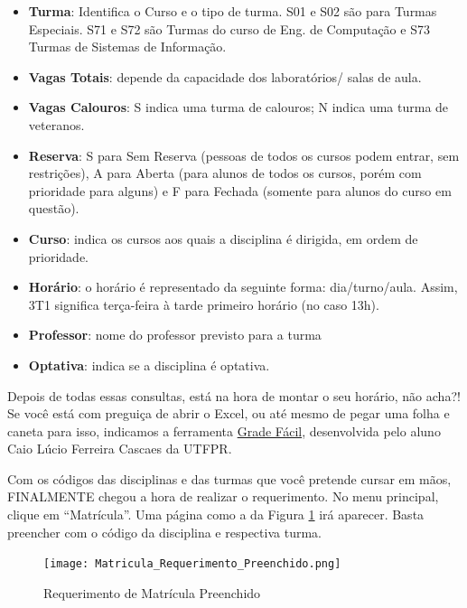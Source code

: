 \documentclass[a4paper,12pt,openany]{article}
\begin{document}
\newpage
\begin{itemize}
\item \textbf{Turma}: Identifica o Curso e o tipo de turma. S01 e S02 são para Turmas Especiais. S71 e S72 são Turmas do curso de Eng. de Computação e S73 Turmas de Sistemas de Informação.

\item \textbf{Vagas Totais}: depende da capacidade dos laboratórios/ salas de aula.

\item \textbf{Vagas Calouros}: S indica uma turma de calouros; N indica uma turma de veteranos.

\item \textbf{Reserva}: S para Sem Reserva (pessoas de todos os cursos podem entrar, sem restrições), A para Aberta (para alunos de todos os cursos, porém com prioridade para alguns) e F para Fechada (somente para alunos do curso em questão).

\item \textbf{Curso}: indica os cursos aos quais a disciplina é dirigida, em ordem de prioridade.

\item \textbf{Horário}: o horário é representado da seguinte forma: dia/turno/aula. Assim, 3T1 significa terça-feira à tarde primeiro horário (no caso 13h).

\item \textbf{Professor}: nome do professor previsto para a turma

\item \textbf{Optativa}: indica se a disciplina é optativa.

\end{itemize}


Depois de todas essas consultas, está na hora de montar o seu horário, não acha?! Se você está com preguiça de abrir o Excel, ou até mesmo de pegar uma folha e caneta para isso, indicamos a ferramenta \href{http://www.caiux.net/utfpr/}{Grade Fácil}, desenvolvida pelo aluno Caio Lúcio Ferreira Cascaes  da UTFPR.

Com os códigos das disciplinas e das turmas que você pretende cursar em mãos, FINALMENTE chegou a hora de realizar o requerimento. No menu principal, clique em ``Matrícula''. Uma página como a da Figura \ref{matriculaRequerimentoPreenchido} irá aparecer. Basta preencher com o código da disciplina e respectiva turma.

	\begin{figure}[ht!]  \centering
		\texttt{[image: Matricula\_Requerimento\_Preenchido.png]}
		\caption{Requerimento de Matrícula Preenchido}
		\label{matriculaRequerimentoPreenchido}
	\end{figure}
\end{document}
